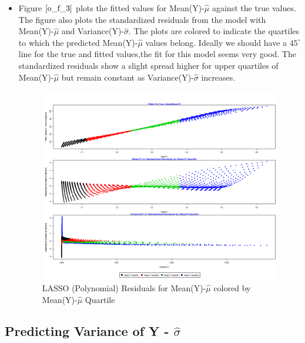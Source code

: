 \documentclass[twoside,12pt]{article}
\begin{document}
\begin{itemize}
\begin{verbatim}
\end{verbatim}

\FloatBarrier
\item
Figure $\eqref{o_f_3}$ plots the fitted values for Mean(Y)-$\hat{\mu}$ against the true values. The figure also plots the standardized residuals from the model with Mean(Y)-$\hat{\mu}$ and Variance(Y)-$\hat{\sigma}$. The plots are colored to indicate the quartiles to which the predicted Mean(Y)-$\hat{\mu}$ values belong. Ideally we should have a $45^{\circ}$ line for the true and fitted values,the fit for this model seems very good. The standardized residuals show a slight spread higher for upper quartiles of Mean(Y)-$\hat{\mu}$ but remain constant as Variance(Y)-$\hat{\sigma}$ increases.
\FloatBarrier
\begin{figure}[!htbp]
\centering
\includegraphics[scale=.50]{images/mt_rse_plot_mean_trg_lasso_poly.png} 
\caption{LASSO (Polynomial) Residuals for  Mean(Y)-$\hat{\mu}$  colored by Mean(Y)-$\hat{\mu}$ Quartile}
\label{o_f_3}
\end{figure}



\end{itemize}







\FloatBarrier
\subsection{Predicting Variance of Y - $\hat{\sigma}$}
\end{document}

